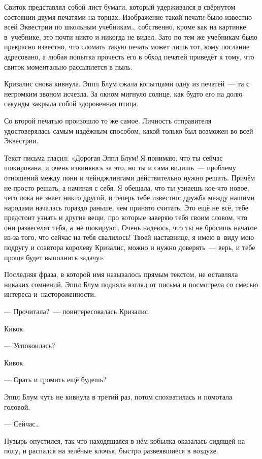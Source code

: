 \documentclass[fontsize=11pt,a5paper,titlepage=firstcover]{scrbook}
\begin{document}
Свиток представлял собой лист бумаги, который удерживался в свёрнутом состоянии двумя печатями на торцах. Изображение такой печати было известно всей Эквестрии по школьным учебникам{\ldots} собственно, кроме как на картинке в~учебнике, это почти никто и никогда не видел. Зато по тем же учебникам было прекрасно известно, что сломать такую печать может лишь тот, кому послание адресовано, а любая попытка прочесть его в обход печатей приведёт к тому, что свиток моментально рассыплется в пыль.

Кризалис снова кивнула. Эппл Блум сжала копытцами одну из печатей~--- та с негромким звоном исчезла. За окном мигнуло солнце, как будто его на долю секунды закрыла собой здоровенная птица.

Со второй печатью произошло то же самое. Личность отправителя удостоверялась самым надёжным способом, какой только был возможен во всей Эквестрии.

Текст письма гласил: «Дорогая Эппл Блум! Я понимаю, что ты сейчас шокирована, и очень извиняюсь за это, но ты и сама видишь~--- проблему отношений между пони и чейнджлингами действительно нужно решать. Причём не просто решать, а начиная с себя. Я обещала, что ты узнаешь кое-что новое, чего пока не знает никто другой, и теперь тебе известно: дружба между нашими народами началась гораздо раньше, чем принято считать. Это ещё не всё, тебе предстоит узнать и другие вещи, про которые заверяю тебя своим словом, что они развеселят тебя, а~не шокируют. Очень надеюсь, что ты не бросишь начатое из-за того, что сейчас на тебя свалилось! Твоей наставнице, я имею в~виду мою подругу и соавтора королеву Кризалис, можно и нужно доверять~--- верь, и тебе проще будет выполнить задачу».

Последняя фраза, в которой имя называлось прямым текстом, не оставляла никаких сомнений. Эппл Блум подняла взгляд от письма и посмотрела со смесью интереса и~настороженности.

--- Прочитала?~--- поинтересовалась Кризалис.

Кивок.

--- Успокоилась?

Кивок.

--- Орать и громить ещё будешь?

Эппл Блум чуть не кивнула в третий раз, потом спохватилась и помотала головой.

--- Сейчас{\ldots}

Пузырь опустился, так что находящаяся в нём кобылка оказалась сидящей на полу, и распался на зелёные клочья, быстро развеявшиеся в воздухе.
\end{document}
